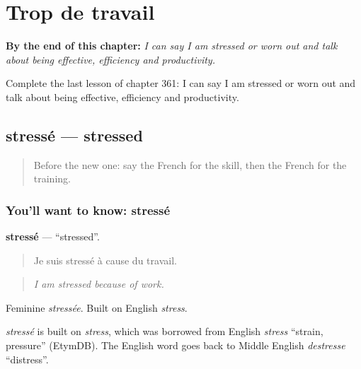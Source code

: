 
\chapter{Trop de travail}
\label{ch:fr-trop-de-travail}

\begin{chapteropening}
\textbf{By the end of this chapter:} \emph{I can say I am stressed or worn out and talk about being effective, efficiency and productivity.}

Complete the last lesson of chapter 361: I can say I am stressed or worn out and talk about being effective, efficiency and productivity.
\end{chapteropening}

\section[stressé]{stressé — stressed}

\label{lesson:FR-C361-stresse}



\begin{quote}
Before the new one: say the French for the skill, then the French for the training.
\end{quote}

\subsection*{You'll want to know: stressé}
\textbf{stressé} — \textquotedblleft{}stressed\textquotedblright{}.

\begin{quote}
Je suis stressé à cause du travail.
\end{quote}

\begin{quote}
\emph{I am stressed because of work.}
\end{quote}

Feminine \emph{stressée}. Built on English \emph{stress}.

\begin{cousinweb}
\emph{stressé} is built on \emph{stress}, which was borrowed from English \emph{stress} \textquotedblleft{}strain, pressure\textquotedblright{} (EtymDB). The English word goes back to Middle English \emph{destresse} \textquotedblleft{}distress\textquotedblright{}.
\end{cousinweb}

